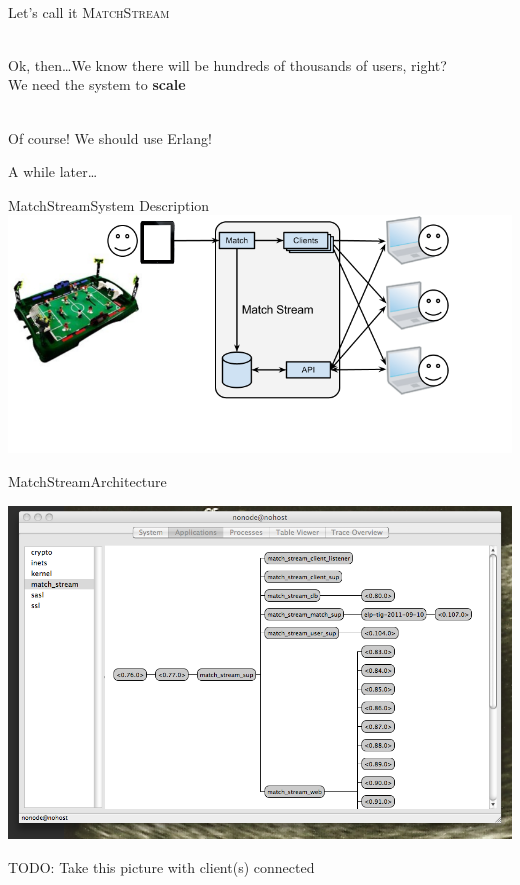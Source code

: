 \documentclass[utf8]{beamer}
\begin{document}
\begin{frame}
	\begin{description}
		\item<+->[Brujo]\ \\ Let's call it \textsc{MatchStream}
		\item<+->[A Friend]\ \\ Ok, then\ldots We know there will be hundreds of thousands of users, right?\\ We need the system to \textbf{scale}
		\item<+->[Brujo]\ \\ Of course! We should use \alert{Erlang}!
	\end{description}
\end{frame}

\begin{frame}
	\begin{center}
		{\Large
			\textsf{A while later\ldots}}
	\end{center}
\end{frame}

\begin{frame}{MatchStream}{System Description}
\includegraphics[width=\textwidth]{img/MatchStream.png}
\end{frame}

\begin{frame}{MatchStream}{Architecture}
	\begin{center}
		\includegraphics[height=.75\textheight]{img/running.png}
	\end{center}
	TODO: Take this picture with client(s) connected
\end{frame}
\end{document}
